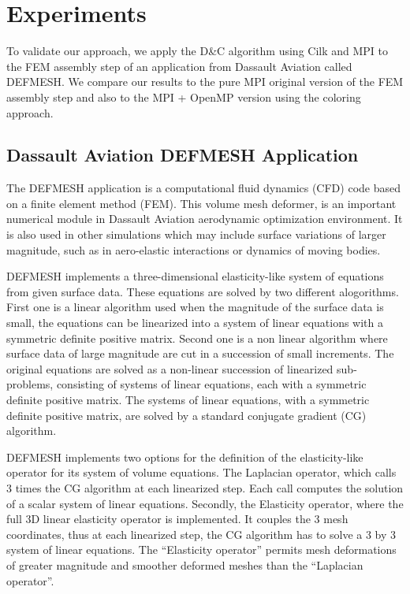 \documentclass{IOS-Book-Article}
\begin{document}
\section{Experiments}
To validate our approach, we apply the D\&C algorithm using Cilk and MPI to the FEM assembly step of an application from Dassault Aviation called DEFMESH.
We compare our results to the pure MPI original version of the FEM assembly step and also to the MPI + OpenMP version using the coloring approach.

\subsection{Dassault Aviation DEFMESH Application}
The DEFMESH application is a computational fluid dynamics (CFD) code based on a finite element method (FEM).
This volume mesh deformer, is an important numerical module in Dassault Aviation aerodynamic optimization environment.
It is also used in other simulations which may include surface variations of larger magnitude, such as in aero-elastic interactions or dynamics of moving bodies.

DEFMESH implements a three-dimensional elasticity-like system of equations from given surface data.
These equations are solved by two different alogorithms.
First one is a linear algorithm used when the magnitude of the surface data is small, the equations can be linearized into a system of linear equations with a symmetric definite positive matrix.
Second one is a non linear algorithm where surface data of large magnitude are cut in a succession of small increments.
The original equations are solved as a non-linear succession of linearized sub-problems, consisting of systems of linear equations, each with a symmetric definite positive matrix.
The systems of linear equations, with a symmetric definite positive matrix, are solved by a standard conjugate gradient (CG) algorithm.

DEFMESH implements two options for the definition of the elasticity-like operator for its system of volume equations.
The Laplacian operator, which calls 3 times the CG algorithm at each linearized step. Each call computes the solution of a scalar system of linear equations.
Secondly, the Elasticity operator, where the full 3D linear elasticity operator is implemented.
It couples the 3 mesh coordinates, thus at each linearized step, the CG algorithm has to solve a 3 by 3 system of linear equations.
The “Elasticity operator” permits mesh deformations of greater magnitude and smoother deformed meshes than the “Laplacian operator”.
\end{document}
